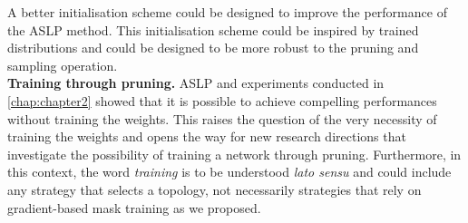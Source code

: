 A better initialisation scheme could be designed to improve the performance of
the \ac{ASLP} method. This initialisation scheme could be inspired by trained
\DIFdelbegin {}\DIFdelend \DIFaddbegin {}\DIFaddend distributions and could be designed to be more robust to the pruning and
sampling operation.\\

\noindent \textbf{Training through pruning.} \ac{ASLP} and experiments conducted
in \cref{chap:chapter2} showed that it is possible to achieve compelling
performances without training the weights. This raises the question of the very
necessity of training the weights and opens the way for new research directions
that investigate the possibility of training a network through pruning.
Furthermore, in this context, the word \emph{training} is to be understood
\emph{lato sensu} and could include any strategy that selects a topology, not
necessarily strategies that rely on gradient-based mask training as we proposed.